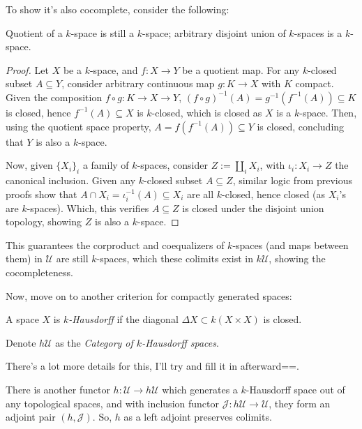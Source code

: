 \documentclass{article}
\begin{document}
To show it's also cocomplete, consider the following:
\begin{prop}
    Quotient of a $k$-space is still a $k$-space; arbitrary disjoint union of $k$-spaces is a $k$-space.
\end{prop}
\begin{proof}
    Let $X$ be a $k$-space, and $f:X\rightarrow Y$ be a quotient map. For any $k$-closed subset $A\subseteq Y$, consider arbitrary continuous map $g:K\rightarrow X$ with $K$ compact. Given the composition $f\circ g:K\rightarrow X\rightarrow Y$, $(f\circ g)^{-1}(A) = g^{-1}(f^{-1}(A))\subseteq K$ is closed, hence $f^{-1}(A)\subseteq X$ is $k$-closed, which is closed as $X$ is a $k$-space. Then, using the quotient space property, $A = f(f^{-1}(A))\subseteq Y$ is closed, concluding that $Y$ is also a $k$-space.

    \hfil

    Now, given $\{X_i\}_i$ a family of $k$-spaces, consider $Z:= \coprod_i X_i$, with $\iota_i:X_i\rightarrow Z$ the canonical inclusion. Given any $k$-closed subset $A\subseteq Z$, similar logic from previous proofs show that $A\cap X_i = \iota_i^{-1}(A)\subseteq X_i$ are all $k$-closed, hence closed (as $X_i$'s are $k$-spaces). Which, this verifies $A\subseteq Z$ is closed under the disjoint union topology, showing $Z$ is also a $k$-space.
\end{proof}
This guarantees the corproduct and coequalizers of $k$-spaces (and maps between them) in $\mathcal{U}$ are still $k$-spaces, which these colimits exist in $k\mathcal{U}$, showing the cocompleteness.

\hfil

Now, move on to another criterion for compactly generated spaces:
\begin{defn}
    A space $X$ is \emph{$k$-Hausdorff} if the diagonal $\Delta X\subset k(X\times X)$ is closed.
\end{defn}

Denote $h\mathcal{U}$ as the \emph{Category of $k$-Hausdorff spaces}. 

There's a lot more details for this, I'll try and fill it in afterward==.

There is another functor $h:\mathcal{U}\rightarrow h\mathcal{U}$ which generates a $k$-Hausdorff space out of any topological spaces, and with inclusion functor $\mathcal{J}:h\mathcal{U}\rightarrow \mathcal{U}$, they form an adjoint pair $(h,\mathcal{J})$. So, $h$ as a left adjoint preserves colimits. 

\hfil
\end{document}

